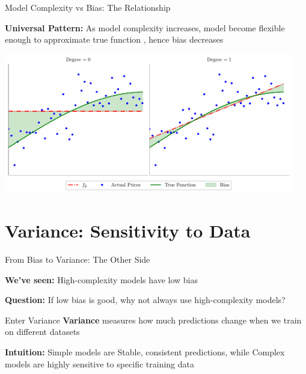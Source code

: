 \documentclass[10pt]{beamer}
\newcommand{\fitpic}[1]{\begin{adjustbox}{max width=\linewidth, max totalheight=0.78\textheight}#1\end{adjustbox}}
\begin{document}
\begin{frame}{Model Complexity vs Bias: The Relationship}
\begin{keypointsbox}
\textbf{Universal Pattern:} As model complexity increases, model become flexible enough  to  approximate true function , hence  bias decreases

\end{keypointsbox}

\begin{center}
\fitpic{\includegraphics[width=0.95\textwidth]{../assets/bias-variance/figures/bias7_latexify.pdf}}
\end{center}


\end{frame}

\section{Variance: Sensitivity to Data}

\begin{frame}{From Bias to Variance: The Other Side}
\begin{alertbox}
\textbf{We've seen:} High-complexity models have low bias

\textbf{Question:} If low bias is good, why not always use high-complexity models?
\end{alertbox}

\begin{definitionbox}{Enter Variance}
\textbf{Variance} measures how much predictions change when we train on different datasets
\end{definitionbox}

\begin{keypointsbox}
\textbf{Intuition:} Simple models  are Stable, consistent predictions, while Complex models are highly sensitive to specific training data

\end{keypointsbox}


\end{frame}
\end{document}

